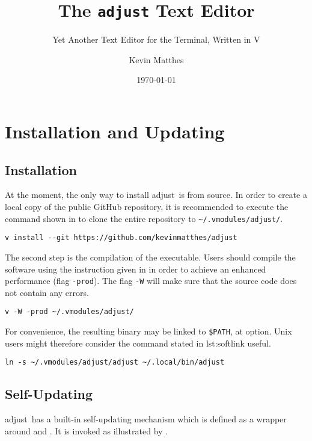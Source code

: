 \documentclass[11pt, a4paper, british]{scrartcl}
\author{Kevin Matthes}
\date{\today}
\subtitle{Yet Another Text Editor for the Terminal, Written in V}
\title{The \texttt{adjust} Text Editor}
\DeclareRobustCommand{\adjust}{\textsf{adjust}}
\begin{document}
\maketitle
\tableofcontents
\listoftables


\newpage
\section{Installation and Updating}
\label{sec:installation-and-updating}
\subsection{Installation}
\label{sec:installation}
At the moment, the only way to install \adjust\ is from source.  In order to
create a local copy of the public GitHub repository, it is recommended to
execute the command shown in  to clone the entire repository
to \texttt{\textasciitilde/.vmodules/adjust/}.

\begin{lstlisting}[caption = Downloading \adjust, label = lst:download]
v install --git https://github.com/kevinmatthes/adjust
\end{lstlisting}

The second step is the compilation of the executable.  Users should compile the
software using the instruction given in  in order to
achieve an enhanced performance (flag \texttt{-prod}).  The flag \texttt{-W}
will make sure that the source code does not contain any errors.

\begin{lstlisting}[caption = Compiling \adjust, label = lst:compilation]
v -W -prod ~/.vmodules/adjust/
\end{lstlisting}

For convenience, the resulting binary may be linked to \texttt{\$PATH}, at
option.  Unix users might therefore consider the command stated in \Vref
{lst:softlink} useful.

\begin{lstlisting}[caption = Softlinking \adjust, label = lst:softlink]
ln -s ~/.vmodules/adjust/adjust ~/.local/bin/adjust
\end{lstlisting}

\subsection{Self-Updating}
\label{sec:self-updating}
\adjust\ has a built-in self-updating mechanism which is defined as a wrapper
around  and .  It is invoked as
illustrated by .
\end{document}
